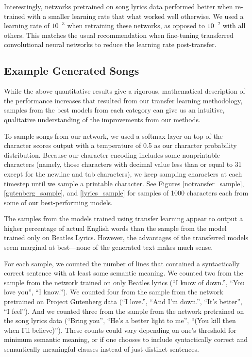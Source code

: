 \documentclass[10pt,twocolumn,letterpaper]{article}
\begin{document}
	Interestingly, networks pretrained on song lyrics data performed better when re-trained with a smaller learning rate that what worked well otherwise. We used a learning rate of $10^{-3}$ when retraining these networks, as opposed to $10^{-2}$ with all others. This matches the usual recommendation when fine-tuning transferred convolutional neural networks to reduce the learning rate post-transfer.
	
	\subsection{Example Generated Songs}
		While the above quantitative results give a rigorous, mathematical description of the performance increases that resulted from our transfer learning methodology, samples from the best models from each category can give us an intuitive, qualitative understanding of the improvements from our methods.
		
		To sample songs from our network, we used a softmax layer on top of the character scores output with a temperature of 0.5 as our character probability distribution. Because our character encoding includes some nonprintable characters (namely, those characters with decimal value less than or equal to 31 except for the newline and tab characters), we keep sampling characters at each timestep until we sample a printable character. See Figures \ref{notransfer_sample}, \ref{gutenberg_sample}, and \ref{lyrics_sample} for samples of 1000 characters each from some of our best-performing models.
		
		The samples from the models trained using transfer learning appear to output a higher percentage of actual English words than the sample from the model trained only on Beatles Lyrics. However, the advantages of the transferred models seem marginal at best---none of the generated text makes much sense.
		
		For each sample, we counted the number of lines that contained a syntactically correct sentence with at least some semantic meaning. We counted two from the sample from the network trained on only Beatles lyrics (``I know of down.'', ``You love you'', ``I know.''). We counted four from the sample from the network pretrained on Project Gutenberg data (``I love.'', ``And I'm down.'', ``It's better'', ``I feel''). And we counted three from the sample from the network pretrained on the song lyrics data (``Bring you'', ``He's a better light to me'', ``(You kill then when I'll believe)''). These counts could vary depending on one's threshold for minimum semantic meaning, or if one chooses to include syntactically correct and semantically meaningful clauses instead of just distinct sentences.
		
\end{document}
